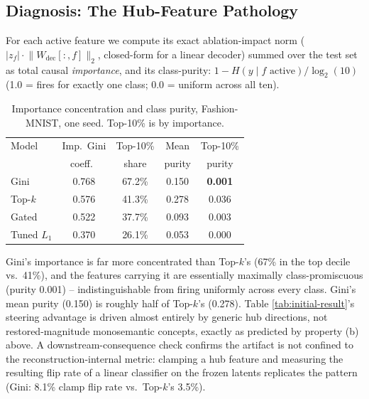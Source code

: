 \documentclass[11pt,twocolumn]{article}
\begin{document}
\subsection{Diagnosis: The Hub-Feature Pathology}
\label{sec:diagnosis}
For each active feature we compute its exact ablation-impact norm ($|z_f|\cdot\lVert W_{\mathrm{dec}}[:,f]\rVert_2$, closed-form for a linear decoder) summed over the test set as total causal \emph{importance}, and its class-purity: $1 - H(y\mid f\text{ active})/\log_2(10)$ (1.0 = fires for exactly one class; 0.0 = uniform across all ten).

\begin{table}[h]
\centering
\caption{Importance concentration and class purity, Fashion-MNIST, one seed. Top-10\% is by importance.}
\label{tab:diagnosis}
\begin{tabular}{@{}lcccc@{}}
\toprule
Model & Imp.\ Gini & Top-10\% & Mean & Top-10\% \\
 & coeff.\ & share & purity & purity \\ \midrule
Gini & 0.768 & 67.2\% & 0.150 & \textbf{0.001} \\
Top-$k$ & 0.576 & 41.3\% & 0.278 & 0.036 \\
Gated & 0.522 & 37.7\% & 0.093 & 0.003 \\
Tuned $L_1$ & 0.370 & 26.1\% & 0.053 & 0.000 \\ \bottomrule
\end{tabular}
\end{table}

Gini's importance is far more concentrated than Top-$k$'s (67\% in the top decile vs.\ 41\%), and the features carrying it are essentially maximally class-promiscuous (purity 0.001) -- indistinguishable from firing uniformly across every class. Gini's mean purity (0.150) is roughly half of Top-$k$'s (0.278). Table \ref{tab:initial-result}'s steering advantage is driven almost entirely by generic hub directions, not restored-magnitude monosemantic concepts, exactly as predicted by property (b) above. A downstream-consequence check confirms the artifact is not confined to the reconstruction-internal metric: clamping a hub feature and measuring the resulting flip rate of a linear classifier on the frozen latents replicates the pattern (Gini: 8.1\% clamp flip rate vs.\ Top-$k$'s 3.5\%).
\end{document}
